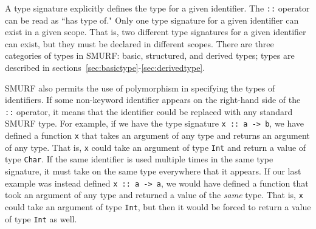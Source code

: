 A type signature explicitly defines the type for a given identifier. The
\texttt{::} operator can be read as ``has type of." Only one type signature
for a given identifier can exist in a given scope. That is, two different
type signatures for a given identifier can exist, but they must be declared
in different scopes. There are three categories of types in SMURF: basic,  structured, and derived types; types are described in sections~\ref{sec:basictype}-\ref{sec:derivedtype}.


SMURF also permits the use of polymorphism in specifying the types of identifiers. If some
non-keyword identifier appears on the right-hand side of the \texttt{::} operator, it means
that the identifier could be replaced with any standard SMURF type. For example, if we have
the type signature \texttt{x :: a -> b}, we have defined a function \texttt{x} that takes
an argument of any type and returns an argument of any type. That is, \texttt{x} could take
an argument of type \texttt{Int} and return a value of type \texttt{Char}.
If the same identifier is used multiple times in the same type signature, 
it must take on the same type everywhere that it appears. If our last example
was instead defined \texttt{x :: a -> a}, we would have defined a function that took an argument
of any type and returned a value of the \emph{same} type. That is, \texttt{x} could take an argument
of type \texttt{Int}, but then it would be forced to return a value of type \texttt{Int} as well.

